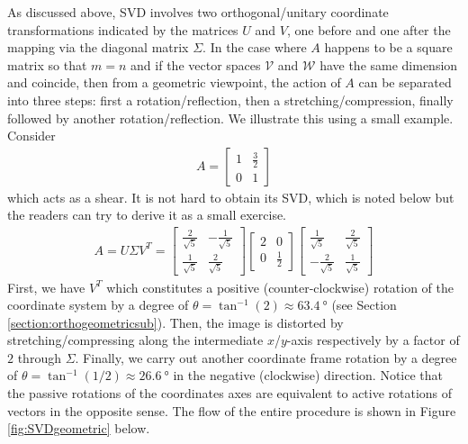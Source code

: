 As discussed above, SVD involves two orthogonal/unitary coordinate transformations indicated by the matrices $U$ and $V$, one before and one after the mapping via the diagonal matrix $\Sigma$. In the case where $A$ happens to be a square matrix so that $m=n$ and if the vector spaces $\mathcal{V}$ and $\mathcal{W}$ have the same dimension and coincide, then from a geometric viewpoint, the action of $A$ can be separated into three steps: first a rotation/reflection, then a stretching/compression, finally followed by another rotation/reflection. We illustrate this using a small example. Consider
\begin{align*}
A = \begin{bmatrix}
1 & \frac{3}{2} \\
0 & 1
\end{bmatrix}
\end{align*}
which acts as a shear. It is not hard to obtain its SVD, which is noted below but the readers can try to derive it as a small exercise.
\begin{align*}
A = U \Sigma V^T
=
\begin{bmatrix}
\frac{2}{\sqrt{5}} & -\frac{1}{\sqrt{5}} \\
\frac{1}{\sqrt{5}} & \frac{2}{\sqrt{5}}
\end{bmatrix}
\begin{bmatrix}
2 & 0 \\
0 & \frac{1}{2}
\end{bmatrix}
\begin{bmatrix}
\frac{1}{\sqrt{5}} & \frac{2}{\sqrt{5}} \\
-\frac{2}{\sqrt{5}} & \frac{1}{\sqrt{5}}
\end{bmatrix}
\end{align*}
First, we have $V^T$ which constitutes a positive (counter-clockwise) rotation of the coordinate system by a degree of $\theta = \tan^{-1}(2) \approx \SI{63.4}{\degree}$ (see Section \ref{section:orthogeometricsub}). Then, the image is distorted by stretching/compressing along the intermediate $x$/$y$-axis respectively by a factor of $2$ through $\Sigma$. Finally, we carry out another coordinate frame rotation by a degree of $\theta = \tan^{-1}(1/2) \approx \SI{26.6}{\degree}$ in the negative (clockwise) direction. Notice that the passive rotations of the coordinates axes are equivalent to active rotations of vectors in the opposite sense. The flow of the entire procedure is shown in Figure \ref{fig:SVDgeometric} below.

